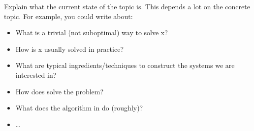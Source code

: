 Explain what the current state of the topic is. This depends a lot on the concrete topic.
For example, you could write about: 
\begin{itemize}
  \item What is a trivial (not suboptimal) way to solve x?
  \item How is x usually solved in practice? 
  \item What are typical ingredients/techniques to construct the systems we are interested in?
  \item How does \cite{testref} solve the problem?
  \item What does the algorithm in \cite{testref} do (roughly)? 
  \item \dots
\end{itemize} 
